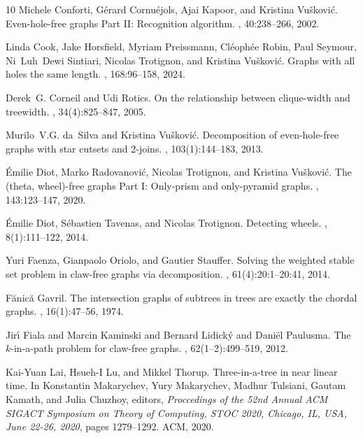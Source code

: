\documentclass[11pt]{article}
\begin{document}
\begin{thebibliography}{10}
Michele Conforti, G{\'e}rard Cornu{\'e}jols, Ajai Kapoor, and Kristina Vu{\v
  s}kovi{\'c}.
\newblock Even-hole-free graphs {P}art {II}: Recognition algorithm.
, 40:238--266, 2002.

Linda Cook, Jake Horsfield, Myriam Preissmann, Cl{\'{e}}oph{\'{e}}e Robin, Paul
  Seymour, Ni~Luh~Dewi Sintiari, Nicolas Trotignon, and Kristina Vu{\v
  s}kovi{\'c}.
\newblock Graphs with all holes the same length.
, 168:96--158, 2024.

Derek~G. Corneil and Udi Rotics.
\newblock On the relationship between clique-width and treewidth.
, 34(4):825--847, 2005.

Murilo~V.G. da~Silva and Kristina Vu{\v s}kovi{\'c}.
\newblock Decomposition of even-hole-free graphs with star cutsets and 2-joins.
, 103(1):144--183,
  2013.

{\'E}milie Diot, Marko Radovanovi{\'c}, Nicolas Trotignon, and Kristina Vu{\v
  s}kovi{\'c}.
\newblock The (theta, wheel)-free graphs {P}art {I:} {O}nly-prism and
  only-pyramid graphs.
, 143:123--147,
  2020.

{\'E}milie Diot, S{\'e}bastien Tavenas, and Nicolas Trotignon.
\newblock Detecting wheels.
, 8(1):111--122,
  2014.

Yuri Faenza, Gianpaolo Oriolo, and Gautier Stauffer.
\newblock Solving the weighted stable set problem in claw-free graphs via
  decomposition.
, 61(4):20:1--20:41, 2014.

F\u{a}nic\u{a} Gavril.
\newblock The intersection graphs of subtrees in trees are exactly the chordal
  graphs.
, 16(1):47--56, 1974.

{Jir{\'{\i}} Fiala and Marcin Kaminski and Bernard Lidick{\'{y}} and
  Dani{\"{e}}l Paulusma}.
\newblock The $k$-in-a-path problem for claw-free graphs.
, 62(1--2):499--519, 2012.

Kai{-}Yuan Lai, Hsueh{-}I Lu, and Mikkel Thorup.
\newblock Three-in-a-tree in near linear time.
\newblock In Konstantin Makarychev, Yury Makarychev, Madhur Tulsiani, Gautam
  Kamath, and Julia Chuzhoy, editors, {\em Proccedings of the 52nd Annual {ACM}
  {SIGACT} Symposium on Theory of Computing, {STOC} 2020, Chicago, IL, USA,
  June 22-26, 2020}, pages 1279--1292. {ACM}, 2020.


\end{thebibliography}
\end{document}
